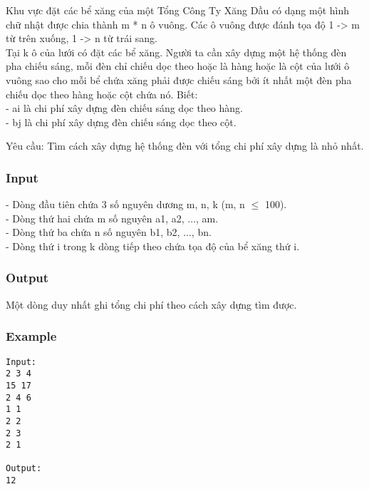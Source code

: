 



   Khu vực đặt các bể xăng của một Tổng Công Ty Xăng Dầu có dạng một hình chữ nhật được chia thành m * n ô vuông. Các ô vuông được đánh tọa độ 1 -> m từ trên xuống, 1 -> n từ trái sang.   
\\   Tại k ô của lưới có đặt các bể xăng. Người ta cần xây dựng một hệ thống đèn pha chiếu sáng, mỗi đèn chỉ chiếu dọc theo hoặc là hàng hoặc là cột của lưới ô vuông sao cho mỗi bể chứa xăng phải được chiếu sáng bởi ít nhất một đèn pha chiếu dọc theo hàng hoặc cột chứa nó. Biết:   
\\   - ai là chi phí xây dựng đèn chiếu sáng dọc theo hàng.   
\\   - bj là chi phí xây dựng đèn chiếu sáng dọc theo cột.  

       Yêu cầu:      Tìm cách xây dựng hệ thống đèn với tổng chi phí xây dựng là nhỏ nhất.  

\subsubsection{   Input  }

   - Dòng đầu tiên chứa 3 số nguyên dương m, n, k (m, n  $\le$  100).   
\\   - Dòng thứ hai chứa m số nguyên a1, a2, ..., am.   
\\   - Dòng thứ ba chứa n số nguyên b1, b2, ..., bn.   
\\   - Dòng thứ i trong k dòng tiếp theo chứa tọa độ của bể xăng thứ i.  

\subsubsection{   Output  }

   Một dòng duy nhất ghi tổng chi phí theo cách xây dựng tìm được.  

\subsubsection{   Example  }
\begin{verbatim}
Input:
2 3 4
15 17
2 4 6
1 1
2 2
2 3
2 1

Output:
12
\end{verbatim}
